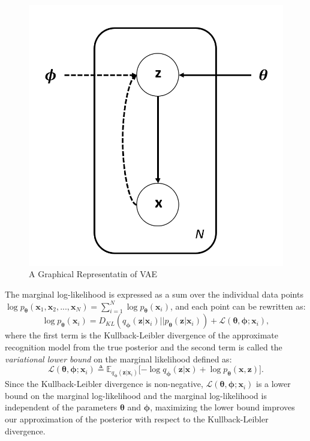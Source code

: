 \documentclass[graybox]{svmult}
\newcommand{\mb}[1]{\mathbf{#1}}
\newcommand{\bx}[0]{\mb{x}}
\newcommand{\bz}[0]{\mb{z}}
\newcommand{\btheta}[0]{\mb{\theta}}
\newcommand{\bphi}[0]{\mb{\phi}}
\newcommand{\Ex}[2]{\mathbb{E}_{{#1}}\Big[ {#2} \Big]}
\begin{document}
\begin{figure}
    \centering
    \includegraphics[scale=0.5]{generativeModel.png}
    \caption{A Graphical Representatin of VAE}
    \label{fig:generativeModel}
\end{figure}


The marginal log-likelihood is expressed as a sum over the individual data points $\log p_\btheta (\bx_1, \bx_2,...,\bx_N)=\sum_{i=1}^N \log p_\btheta(\bx_i)$, and each point can be rewritten as: 
\begin{equation}
\log{p_\btheta(\bx_i)}= D_{KL}\left( q_{\bphi} \left( \bz | \bx_i \right) || p_{\btheta} (\bz|\bx_i) \right) +\mathcal{L}(\btheta,\bphi ; \bx_i),
\end{equation}
where the first term is the Kullback-Leibler divergence of the approximate recognition model from the true posterior and the second term is called the \emph{variational lower bound} on the marginal likelihood defined as:
\begin{equation}
\label{eq:VLB_Defined}
    \mathcal{L}(\btheta,\bphi ; \bx_i) \triangleq \Ex{q_\bphi (\bz | \bx_i)}{ -\log{q_\bphi (\bz|\bx)} + \log{p_\btheta (\bx,\bz)} } .
\end{equation}
Since the Kullback-Leibler divergence is non-negative, $\mathcal{L}(\btheta,\bphi ; \bx_i)$ is a lower bound on the marginal log-likelihood and the marginal log-likelihood is independent of the parameters $\btheta$ and $\bphi$, maximizing the lower bound improves our approximation of the posterior with respect to the Kullback-Leibler divergence. 
\end{document}

